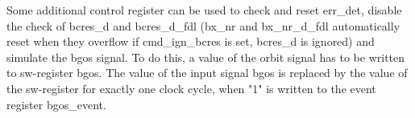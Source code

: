 
Some additional control register can be used to check and reset err\_det, disable the check of bcres\_d and bcres\_d\_fdl (bx\_nr and bx\_nr\_d\_fdl automatically reset when they overflow if cmd\_ign\_bcres is set, bcres\_d is ignored) and simulate the bgos signal. To do this, a value of the orbit signal has to be written to sw-register bgos. The value of the input signal bgos is replaced by the value of the sw-register for exactly one clock cycle, when "1" is written to the event register bgos\_event.


